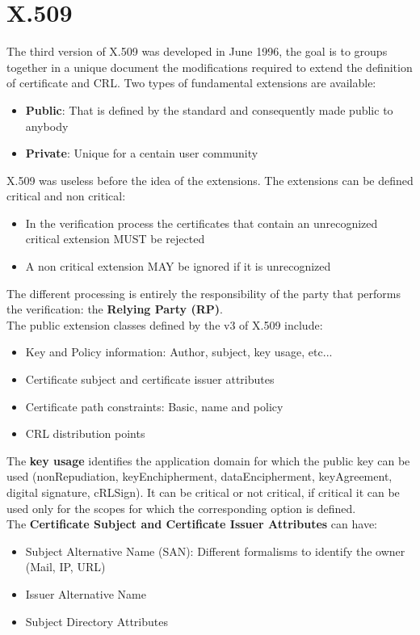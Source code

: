 \documentclass[12pt]{article}
\begin{document}
\section{X.509}
The third version of X.509 was developed in June 1996, the goal is to groups together in a unique document the modifications required to extend the definition of certificate and CRL. Two types of fundamental extensions are available:
\begin{itemize}
  \item \textbf{Public}: That is defined by the standard and consequently made public to anybody
  \item \textbf{Private}: Unique for a centain user community
\end{itemize}
X.509 was useless before the idea of the extensions. The extensions can be defined critical and non critical:
\begin{itemize}
  \item In the verification process the certificates that contain an unrecognized critical extension MUST be rejected
  \item A non critical extension MAY be ignored if it is unrecognized
\end{itemize}
The different processing is entirely the responsibility of the party that performs the verification: the \textbf{Relying Party (RP)}.\\
The public extension classes defined by the v3 of X.509 include:
\begin{itemize}
  \item Key and Policy information: Author, subject, key usage, etc...
  \item Certificate subject and certificate issuer attributes
  \item Certificate path constraints: Basic, name and policy
  \item CRL distribution points
\end{itemize}
The \textbf{key usage} identifies the application domain for which the public key can be used (nonRepudiation, keyEnchipherment, dataEncipherment, keyAgreement, digital signature, cRLSign). It can be critical or not critical, if critical it can be used only for the scopes for which the corresponding option is defined.\\
The \textbf{Certificate Subject and Certificate Issuer Attributes} can have:
\begin{itemize}
  \item Subject Alternative Name (SAN): Different formalisms to identify the owner (Mail, IP, URL)
  \item Issuer Alternative Name
  \item Subject Directory Attributes
\end{itemize}
\end{document}
